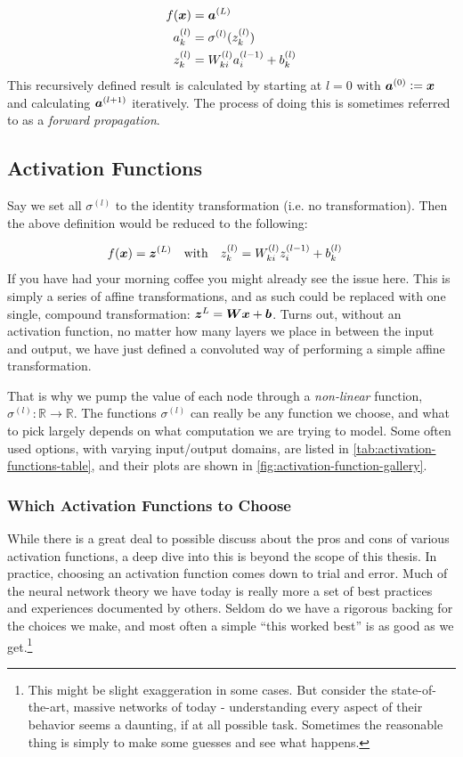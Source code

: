 \documentclass[Thesis.tex]{subfiles}
\begin{document}
 \begin{align}
   f(\bm{x}) &= \bm{a}^{(L)}\\
   a_k^{(l)} &= \sigma^{(l)}(z_k^{(l)})\\
   z_k^{(l)} &= W^{(l)}_{ki}a_i^{(l-1)} + b^{(l)}_k
 \end{align}
This recursively defined result is calculated by starting at $l=0$ with
$\bm{a}^{(0)}\vcentcolon= \bm{x}$ and calculating $\bm{a}^{(l+1)}$ iteratively. The
process of doing this is sometimes referred to as a \emph{forward propagation}.


\subsection{Activation Functions}
\label{sec:ml-activation-functions}

Say we set all $\sigma^{(l)}$ to the identity transformation (i.e. no
transformation). Then the above definition would be reduced to the following:

\begin{align}
  f(\vx) = \vb{z}^{(L)}\qq{with}
   z_k^{(l)} &= W^{(l)}_{ki}z_i^{(l-1)} + b^{(l)}_k
\end{align}
If you have had your morning coffee you might already see the issue here. This
is simply a series of affine transformations, and as such could be replaced with
one single, compound transformation: $\bm{z}^{L} = \bm{W}\bm{x} + \bm{b}$. Turns
out, without an activation function, no matter how many layers we place in
between the input and output, we have just defined a convoluted way of
performing a simple affine transformation.

That is why we pump the value of each
node through a \emph{non-linear} function, $\sigma^{(l)}: \mathbb{R}\to\mathbb{R}$.
The functions $\sigma^{(l)}$ can really be any function we choose, and what to
pick largely depends on what computation we are trying to model. Some often used
options, with varying input/output domains, are listed in
\cref{tab:activation-functions-table}, and their plots are shown in
\cref{fig:activation-function-gallery}.

\subsubsection{Which Activation Functions to Choose}

While there is a great deal to possible discuss about the pros and cons of various
activation functions, a deep dive into this is beyond the scope of this
thesis. In practice, choosing an activation function comes down to trial
and error. Much of the neural network theory we have today is really more a set
of best practices and experiences documented by others. Seldom do we have a
rigorous backing for the choices we make, and most often a simple ``this worked
best'' is as good as we get.\footnote{This might be slight exaggeration in some
cases. But consider the state-of-the-art, massive networks of today -
understanding every aspect of their behavior seems a daunting, if at all
possible task. Sometimes the reasonable thing is simply to make some guesses and
see what happens.}
\end{document}
